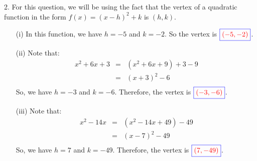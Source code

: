 \documentclass[addpoints, 12pt]{exam}
\theoremstyle{remark}
\begin{document}
2. For this question, we will be using the fact that the vertex of a quadratic function in the form $f(x) = (x - h)^2 + k$ is $(h, k)$.
\begin{enumerate}
    \item [(i)] In this function, we have $h = -5$ and $k = -2$. So the vertex is {\boldmath $\textcolor{blue}{\boxed{\textcolor{red}{(-5, -2)}}}$}.
    \item [(ii)]Note that:
    \begin{eqnarray*}
        x^2 + 6x + 3 & = & (x^2 + 6x + 9) + 3 - 9 \\
        & = & (x + 3)^2 - 6 \\
    \end{eqnarray*}
    So, we have $h = -3$ and $k = -6$. Therefore, the vertex is {\boldmath $\textcolor{blue}{\boxed{\textcolor{red}{(-3, -6)}}}$}.
    \item [(iii)]Note that:
    \begin{eqnarray*}
        x^2 - 14x & = & (x^2 - 14x + 49) - 49 \\
        & = & (x - 7)^2 - 49 \\
    \end{eqnarray*}
     So, we have $h = 7$ and $k = -49$. Therefore, the vertex is {\boldmath $\textcolor{blue}{\boxed{\textcolor{red}{(7, -49)}}}$}.
    \newline
    \newline
    \newline
    \newline
    \newline
    \newline
    \newline
    \newline
\end{enumerate}
\end{document}
